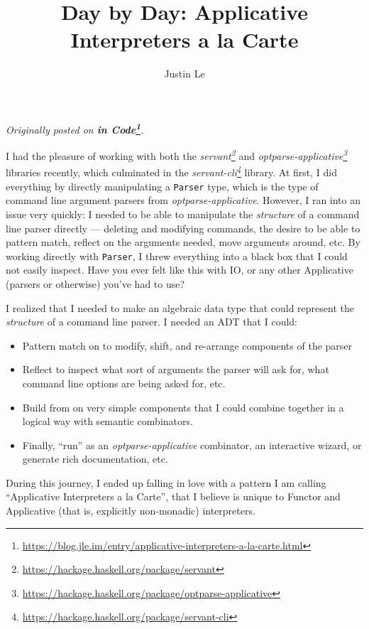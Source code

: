 \documentclass[]{article}
\title{Day by Day: Applicative Interpreters a la Carte}
\author{Justin Le}
\renewcommand{\href}[2]{#2\footnote{\url{#1}}}
\begin{document}
\maketitle

\emph{Originally posted on
\textbf{\href{https://blog.jle.im/entry/applicative-interpreters-a-la-carte.html}{in
Code}}.}

I had the pleasure of working with both the
\emph{\href{https://hackage.haskell.org/package/servant}{servant}} and
\emph{\href{https://hackage.haskell.org/package/optparse-applicative}{optparse-applicative}}
libraries recently, which culminated in the
\emph{\href{https://hackage.haskell.org/package/servant-cli}{servant-cli}}
library. At first, I did everything by directly manipulating a \texttt{Parser}
type, which is the type of command line argument parsers from
\emph{optparse-applicative}. However, I ran into an issue very quickly: I needed
to be able to manipulate the \emph{structure} of a command line parser directly
--- deleting and modifying commands, the desire to be able to pattern match,
reflect on the arguments needed, move arguments around, etc. By working directly
with \texttt{Parser}, I threw everything into a black box that I could not
easily inspect. Have you ever felt like this with IO, or any other Applicative
(parsers or otherwise) you've had to use?

I realized that I needed to make an algebraic data type that could represent the
\emph{structure} of a command line parser. I needed an ADT that I could:

\begin{itemize}
\tightlist
\item
  Pattern match on to modify, shift, and re-arrange components of the parser
\item
  Reflect to inspect what sort of arguments the parser will ask for, what
  command line options are being asked for, etc.
\item
  Build from on very simple components that I could combine together in a
  logical way with semantic combinators.
\item
  Finally, ``run'' as an \emph{optparse-applicative} combinator, an interactive
  wizard, or generate rich documentation, etc.
\end{itemize}

During this journey, I ended up falling in love with a pattern I am calling
``Applicative Interpreters a la Carte'', that I believe is unique to Functor and
Applicative (that is, explicitly non-monadic) interpreters.
\end{document}

